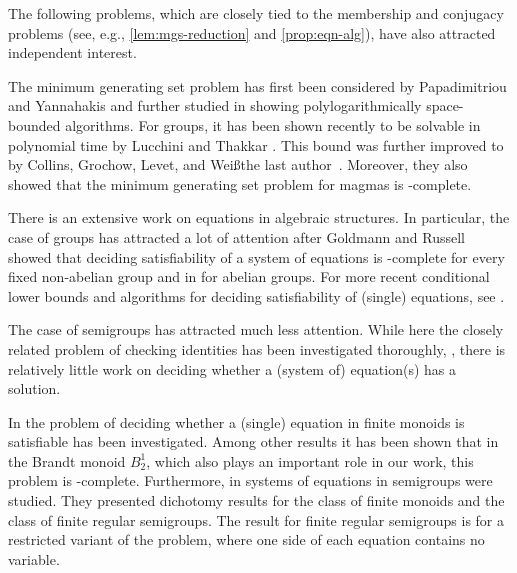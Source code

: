 \medbreak

The following problems, which are closely tied to the membership and conjugacy problems (see, e.g., \cref{lem:mgs-reduction} and \cref{prop:eqn-alg}), have also attracted independent interest.


The minimum generating set problem has first been considered by Papadimitriou and Yannahakis \cite{PapadimitriouY96} and further studied in \cite{ArvindT06,Tang13Thesis} showing polylogarithmically space-bounded algorithms.
For groups, it has been shown recently to be solvable in polynomial time by Lucchini and Thakkar \cite{LucchiniT24}.
This bound was further improved to \NC by Collins, Grochow, Levet, and \ifAnonimous Weiß\else the last author\fi~\cite{CollinsGLW24}.
Moreover, they also showed that the minimum generating set problem for magmas is \NP-complete.



There is an extensive work on equations in algebraic structures. 
In particular, the case of groups has attracted a lot of attention after Goldmann and Russell \cite{GoldmannR02} showed that deciding satisfiability of a system of equations is \NP-complete for every fixed non-abelian group and in \Ptime for abelian groups. 
For more recent conditional lower bounds and algorithms for deciding satisfiability of (single) equations, see \eg \cite{IdziakKKW22,IdziakKKW24,FoldvariH19}.

The case of semigroups has attracted much less attention.
While here the closely related problem of checking identities has been investigated thoroughly, \cite{Klima09,SeifS06,Kisielewicz04,AlmeidaVG09,Seif05}, there is relatively little work on deciding whether a (system of) equation(s) has a solution.

In \cite{BarringtonMMTT00} the problem of deciding whether a (single) equation in finite monoids is satisfiable has been investigated.
Among other results it has been shown that in the Brandt monoid $B_2^1$, which also plays an important role in our work, this problem is \NP-complete.
Furthermore, in \cite{KlimaTT07} systems of equations in semigroups were studied.
They presented dichotomy results for the class of finite monoids and the class of finite regular semigroups.
The result for finite regular semigroups is for a restricted variant of the problem, where one side of each equation contains no variable.